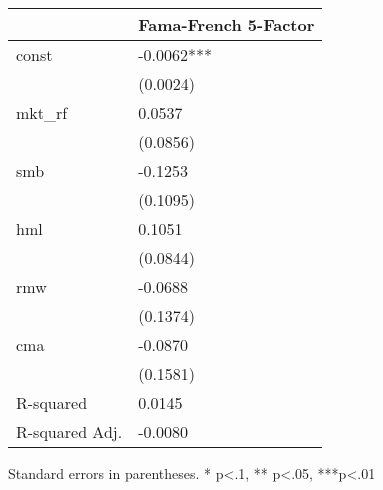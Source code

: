 \begin{table}
\caption{}
\label{}
\begin{center}
\begin{tabular}{ll}
\hline
               & Fama-French 5-Factor  \\
\hline
const          & -0.0062***            \\
               & (0.0024)              \\
mkt\_rf        & 0.0537                \\
               & (0.0856)              \\
smb            & -0.1253               \\
               & (0.1095)              \\
hml            & 0.1051                \\
               & (0.0844)              \\
rmw            & -0.0688               \\
               & (0.1374)              \\
cma            & -0.0870               \\
               & (0.1581)              \\
R-squared      & 0.0145                \\
R-squared Adj. & -0.0080               \\
\hline
\end{tabular}
\end{center}
\end{table}
\bigskip
Standard errors in parentheses. \newline 
* p<.1, ** p<.05, ***p<.01